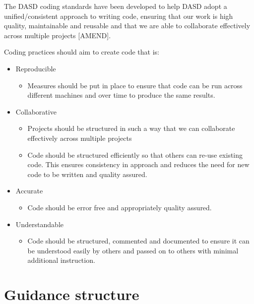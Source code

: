 \documentclass[]{book}
\providecommand{\tightlist}{%
  \setlength{\itemsep}{0pt}\setlength{\parskip}{0pt}}
\begin{document}
The DASD coding standards have been developed to help DASD adopt a unified/consistent approach to writing code, ensuring that our work is high quality, maintainable and reusable and that we are able to collaborate effectively across multiple projects {[}AMEND{]}.

Coding practices should aim to create code that is:

\begin{itemize}
\tightlist
\item
  Reproducible

  \begin{itemize}
  \tightlist
  \item
    Measures should be put in place to ensure that code can be run across different machines and over time to produce the same results.\\
  \end{itemize}
\item
  Collaborative

  \begin{itemize}
  \tightlist
  \item
    Projects should be structured in such a way that we can collaborate effectively across multiple projects
  \item
    Code should be structured efficiently so that others can re-use existing code. This ensures consistency in approach and reduces the need for new code to be written and quality assured.\\
  \end{itemize}
\item
  Accurate

  \begin{itemize}
  \tightlist
  \item
    Code should be error free and appropriately quality assured.\\
  \end{itemize}
\item
  Understandable

  \begin{itemize}
  \tightlist
  \item
    Code should be structured, commented and documented to ensure it can be understood easily by others and passed on to others with minimal additional instruction.
  \end{itemize}
\end{itemize}

\hypertarget{structure}{%
\section{Guidance structure}\label{structure}}
\end{document}
